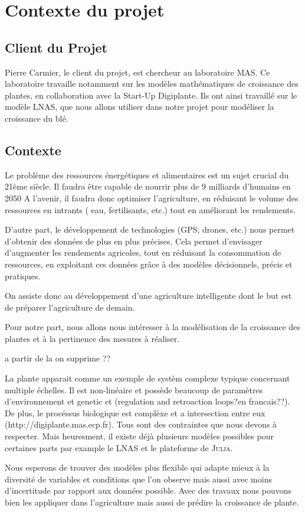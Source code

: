 \section{Contexte du projet}

\subsection{Client du Projet}
Pierre Carmier, le client du projet, est chercheur au laboratoire MAS. Ce laboratoire travaille notamment sur les modèles mathématiques de croissance des plantes, en collaboration avec la Start-Up Digiplante. Ils ont ainsi travaillé sur le modèle LNAS, que nous allons utiliser dans notre projet pour modéliser la croissance du blé.
\subsection{Contexte}
Le problème des ressources énergétiques et alimentaires est un sujet crucial du  21ème siècle. Il faudra être capable de nourrir plus de 9 milliards d'humains en 2050
A l'avenir, il faudra donc optimiser l'agriculture, en réduisant le volume des ressources en intrants ( eau, fertilisants, etc.) tout en améliorant les rendements.

D'autre part, le développement de technologies (GPS, drones, etc.) nous permet d'obtenir des données de plus en plus précises. 
Cela permet d'envisager d'augmenter les rendements agricoles, tout en réduisant la consommation de ressources, en exploitant ces données grâce à des modèles décisionnels, précis et pratiques. 

On assiste donc au développement d'une agriculture intelligente dont le but est de préparer
l'agriculture de demain.

Pour notre part, nous allons nous intéresser à la modélisation de la croissance des plantes et à la pertinence des mesures à réaliser.


a partir de la on supprime ??


La plante apparait comme un exemple de systèm complexe typique concernant 
multiple échelles. Il est non-linéaire et possède beaucoup de paramètres
d'environnement et genetic et (regulation and retroaction loops?en francais??).
De plus,  le procéssus biologique est complèxe et a intersection entre eux
(http://digiplante.mas.ecp.fr). Tous sont des contraintes que 
nous devons à respecter. Mais heuresment, 
il existe déjà plusieurs modèles possibles pour certaines parts 
par example le LNAS et le plateforme de \textsc{Julia}.

Nous esperons de trouver des modèles plus flexible qui adapte mieux à la diversité
de variables et conditions que l'on observe mais aussi avec moins d'incertitude 
par rapport aux données possible. Avec des travaux 
nous pouvons bien les appliquer dans l'agriculture 
mais aussi de prédire la croissance de plante.
